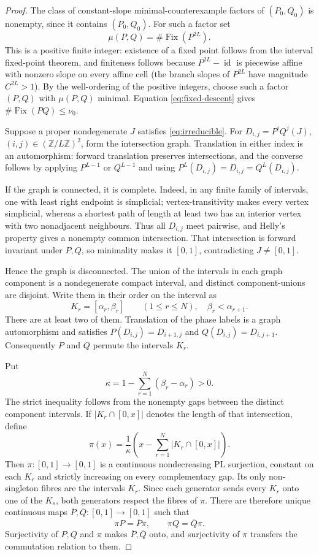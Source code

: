 \documentclass[11pt]{article}
\newcommand{\I}{[0,1]}
\newcommand{\Fix}{\operatorname{Fix}}
\newcommand{\id}{\operatorname{id}}
\begin{document}
\begin{proof}
The class of constant-slope minimal-counterexample factors of $(P_0,Q_0)$ is nonempty, since it contains
$(P_0,Q_0)$. For such a factor set
\[
\mu(P,Q)=\#\Fix(P^{2L}).
\]
This is a positive finite integer: existence of a fixed point follows from the interval fixed-point theorem,
and finiteness follows because $P^{2L}-\id$ is piecewise affine with nonzero slope on every affine cell
(the branch slopes of $P^{2L}$ have magnitude $C^{2L}>1$). By the well-ordering of the positive integers, choose such a factor $(P,Q)$ with $\mu(P,Q)$ minimal.
Equation \eqref{eq:fixed-descent} gives $\#\Fix(PQ)\le\nu_0$.

Suppose a proper nondegenerate $J$ satisfies \eqref{eq:irreducible}. For
$D_{i,j}=P^iQ^j(J)$, $(i,j)\in(\mathbb Z/L\mathbb Z)^2$, form the intersection graph. Translation in
either index is an automorphism: forward translation preserves intersections, and the converse follows
by applying $P^{L-1}$ or $Q^{L-1}$ and using $P^L(D_{i,j})=D_{i,j}=Q^L(D_{i,j})$.

If the graph is connected, it is complete. Indeed, in any finite family of intervals, one with least
right endpoint is simplicial; vertex-transitivity makes every vertex simplicial, whereas a shortest path
of length at least two has an interior vertex with two nonadjacent neighbours. Thus all $D_{i,j}$ meet
pairwise, and Helly's property gives a nonempty common intersection. That intersection is forward
invariant under $P,Q$, so minimality makes it $\I$, contradicting $J\ne\I$.

Hence the graph is disconnected. The union of the intervals in each graph component is a nondegenerate
compact interval, and distinct component-unions are disjoint. Write them in their order on the interval as
\[
K_r=[\alpha_r,\beta_r]\qquad(1\leq r\leq N),
\quad \beta_r<\alpha_{r+1}.
\]
There are at least two of them. Translation of the phase labels is a graph automorphism and satisfies
$P(D_{i,j})=D_{i+1,j}$ and $Q(D_{i,j})=D_{i,j+1}$. Consequently $P$ and $Q$ permute the intervals
$K_r$.

Put
\[
\kappa=1-\sum_{r=1}^N(\beta_r-\alpha_r)>0.
\]
The strict inequality follows from the nonempty gaps between the distinct component intervals. If
$|K_r\cap[0,x]|$ denotes the length of that intersection, define
\[
\pi(x)=\frac{1}{\kappa}
 \left(x-\sum_{r=1}^N|K_r\cap[0,x]|\right).
\]
Then $\pi:\I\to\I$ is a continuous nondecreasing PL surjection, constant on each $K_r$ and strictly
increasing on every complementary gap. Its only non-singleton fibres are the intervals $K_r$. Since each
generator sends every $K_r$ onto one of the $K_s$, both generators respect the fibres of $\pi$. There are
therefore unique continuous maps $\bar P,\bar Q:\I\to\I$ such that
\[
\pi P=\bar P\pi,\qquad \pi Q=\bar Q\pi.
\]
Surjectivity of $P,Q$ and $\pi$ makes $\bar P,\bar Q$ onto, and surjectivity of $\pi$ transfers the
commutation relation to them.


\end{proof}
\end{document}

